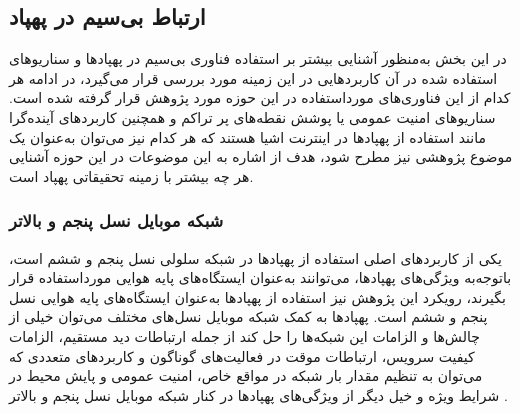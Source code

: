 \subsection{ارتباط بی‌سیم در پهپاد}
در این بخش به‌منظور آشنایی بیشتر بر استفاده فناوری بی‌سیم در پهپادها و سناریوهای استفاده شده در آن کاربردهایی در این زمینه مورد بررسی قرار می‌گیرد، در ادامه هر کدام از این فناوری‌های مورداستفاده در این حوزه مورد پژوهش قرار گرفته شده است. سناریوهای امنیت عمومی یا پوشش نقطه‌های پر تراکم و همچنین کاربردهای آینده‌گرا مانند استفاده از پهپادها در اینترنت اشیا هستند که هر کدام نیز می‌توان به‌عنوان یک موضوع پژوهشی نیز مطرح شود، هدف از اشاره به این موضوعات در این حوزه آشنایی هر چه بیشتر با زمینه تحقیقاتی پهپاد است. 
\subsubsection{شبکه موبایل نسل پنجم و بالاتر}
یکی از کاربردهای اصلی استفاده از پهپادها در شبکه سلولی نسل پنجم و ششم است، باتوجه‌به ویژگی‌های پهپادها، می‌توانند به‌عنوان ایستگاه‌های پایه هوایی مورداستفاده قرار بگیرند، رویکرد این پژوهش نیز استفاده از پهپادها به‌عنوان ایستگاه‌های پایه هوایی نسل پنجم و ششم است. پهپادها به کمک شبکه موبایل نسل‌های مختلف می‌توان خیلی از چالش‌ها و الزامات این شبکه‌ها را حل کند از جمله ارتباطات دید مستقیم، الزامات کیفیت سرویس، ارتباطات موقت در فعالیت‌های گوناگون و کاربردهای متعددی که می‌توان به تنظیم مقدار بار شبکه در مواقع خاص، امنیت عمومی و پایش محیط در شرایط ویژه و خیل دیگر از ویژگی‌های پهپادها در کنار شبکه موبایل نسل پنجم و بالاتر \cite{zeng2019accessing,li2018uav}.
